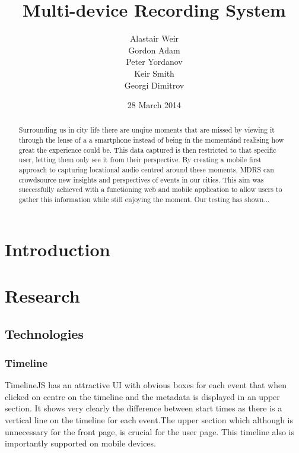 \documentclass{l3proj}
\begin{document}
\setcounter{secnumdepth}{3}
\title{Multi-device Recording System}
\author{Alastair Weir \\
        Gordon Adam \\
        Peter Yordanov \\
        Keir Smith \\
        Georgi Dimitrov}
\date{28 March 2014}
\maketitle
\begin{abstract}

Surrounding us in city life there are unqiue moments that are missed by viewing it through the lense of a a smartphone instead of being \'in the moment\' and realising how great the experience could be. This data captured is then restricted to that specific user, letting them only see it from their perspective. By creating a mobile first approach to capturing locational audio centred around these moments, MDRS can crowdsource new insights and perspectives of events in our cities. This aim was successfully achieved with a functioning web and mobile application to allow users to gather this information while still enjoying the moment. Our testing has shown...

\end{abstract}
\educationalconsent
\tableofcontents
\chapter{Introduction}
\label{intro}

\chapter{Research}
\label{Research}

\section{Technologies}

\subsection{Timeline}

TimelineJS has an attractive UI with obvious boxes for each event that when clicked on centre on the timeline and the metadata is displayed in an upper section. It shows very clearly the difference between start times as there is a vertical line on the timeline for each event.The upper section which although is unnecessary for the front page, is crucial for the user page. This timeline also is importantly supported on mobile devices.
\end{document}

